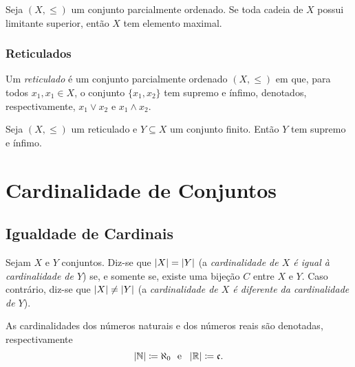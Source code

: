 \begin{lema}
	Seja $(X,\leq)$ um conjunto parcialmente ordenado. Se toda cadeia de $X$ possui limitante superior, então $X$ tem elemento maximal.
\end{lema}

\subsection{Reticulados}

\begin{defi}
	Um \emph{reticulado} é um conjunto parcialmente ordenado $(X,\leq)$ em que, para todos $x_1, x_1 \in X$, o conjunto $\{x_1,x_2\}$ tem supremo e ínfimo, denotados, respectivamente, $x_1 \vee x_2$ e $x_1 \wedge x_2$.
\end{defi}

\begin{prop}
	Seja $(X,\leq)$ um reticulado e $Y \subseteq X$ um conjunto finito. Então $Y$ tem supremo e ínfimo.
\end{prop}













\chapter{Cardinalidade de Conjuntos}

\section{Igualdade de Cardinais}

\begin{defi}
	Sejam $X$ e $Y$ conjuntos. Diz-se que $\left\vert{X}\right\vert = \left\vert{Y}\right\vert$ (a \emph{cardinalidade de $X$ é igual à cardinalidade de $Y$}) se, e somente se, existe uma bijeção $C$ entre $X$ e $Y$. Caso contrário, diz-se que $\left\vert{X}\right\vert \neq \left\vert{Y}\right\vert$ (a \emph{cardinalidade de $X$ é diferente da cardinalidade de $Y$}).

	As cardinalidades dos números naturais e dos números reais são denotadas, respectivamente
	\begin{equation*}
	\left\vert{\mathbb{N}}\right\vert \coloneqq \aleph_0 \text{\ \ e\ \ } \left\vert{\mathbb{R}}\right\vert \coloneqq \mathfrak c.
	\end{equation*}
\end{defi}

